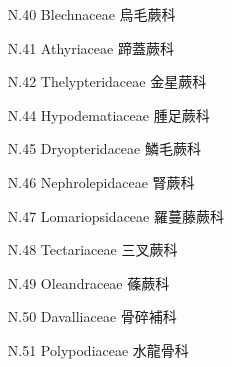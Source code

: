 \begin{enumerate}
\begin{enumerate}
      \item[N.40] Blechnaceae 烏毛蕨科   
        
      \item[N.41] Athyriaceae 蹄蓋蕨科   
        
      \item[N.42] Thelypteridaceae 金星蕨科   
        
      \item[N.44] Hypodematiaceae 腫足蕨科   
        
      \item[N.45] Dryopteridaceae 鱗毛蕨科   
        
      \item[N.46] Nephrolepidaceae 腎蕨科   
        
      \item[N.47] Lomariopsidaceae 羅蔓藤蕨科   
        
      \item[N.48] Tectariaceae 三叉蕨科   
        
      \item[N.49] Oleandraceae 蓧蕨科   
        
      \item[N.50] Davalliaceae 骨碎補科   
        
      \item[N.51] Polypodiaceae 水龍骨科   
        
    \end{enumerate}
\end{enumerate}
\vspace{2ex} 
